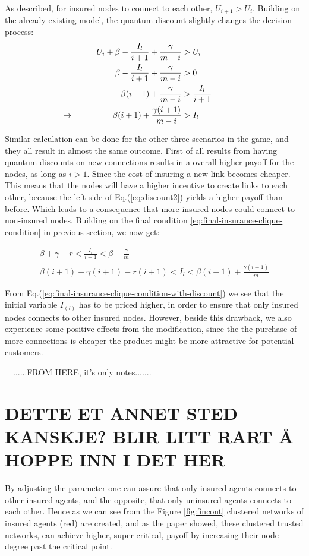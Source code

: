 As described, for insured nodes to connect to each other, $U_{i+1} > U_{i}$. Building on the already existing model, the quantum discount slightly changes the decision process:
\begin{eqnarray}
U_{i}+\beta-\frac{I_{l}}{i+1}+\frac{\gamma}{m-i}&>U_{i} \nonumber \\ 
\beta-\frac{I_{l}}{i+1}+\frac{\gamma}{m-i}&>0 \nonumber \\ 
\beta (i+1)+\frac{\gamma}{m-i}&>\frac{I_{l}}{i+1} \nonumber \\
\llap{$\rightarrow$\hspace{50pt}}  \beta (i+1)+\frac{\gamma (i+1)}{m-i}&>I_{l}
\label{eq:discount2}
\end{eqnarray}

Similar calculation can be done for the other three scenarios in the game, and they all result in almost the same outcome. First of all results from having quantum discounts on new connections results in a overall higher payoff for the nodes, as long as $i>1$. Since the cost of insuring a new link becomes cheaper. This means that the nodes will have a higher incentive to create links to each other, because the left side of Eq.(\ref{eq:discount2}) yields a higher payoff than before. Which leads to a consequence that more insured nodes could connect to non-insured nodes. 
Building on the final condition \ref{eq:final-insurance-clique-condition} in previous section, we now get:

\begin{eqnarray}
\beta+\gamma-r<\frac{I_{l}}{i+1}<\beta+\frac{\gamma}{m} \nonumber \\
\beta(i+1)+\gamma(i+1)-r(i+1)<I_{l}<\beta(i+1)+\frac{\gamma(i+1)}{m}
\label{eq:final-insurance-clique-condition-with-discount}
\end{eqnarray}


From Eq.(\ref{eq:final-insurance-clique-condition-with-discount}) we see that the initial variable $I_(l)$ has to be priced higher, in order to ensure that only insured nodes connects to other insured nodes. However, beside this drawback, we also experience some positive effects from the modification, since the the purchase of more connections is cheaper the product might be more attractive for potential customers. 







\
\
......FROM HERE, it's only notes.......
\section{DETTE ET ANNET STED KANSKJE? BLIR LITT RART Å HOPPE INN I DET HER}
By adjusting the parameter one can assure that only insured agents connects to other insured agents, and the opposite,
that only uninsured agents connects to each other. Hence as we can see from the Figure \ref{fig:fincont} clustered
networks of insured agents (red) are created, and  as the paper \cite{contagion} showed, these clustered trusted
networks, can achieve higher, super-critical, payoff by increasing their node degree past the critical point.

